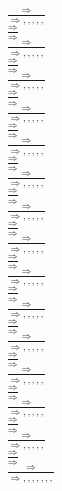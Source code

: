 \documentclass[11pt]{article}
\begin{document}
\begin{center}
\bigskip
\\$\frac{\Rightarrow }{\Rightarrow , , , , , }$
\bigskip
\\$\frac{\Rightarrow }{\Rightarrow }$
\bigskip
\\$\frac{\Rightarrow }{\Rightarrow , , , , , }$
\bigskip
\\$\frac{\Rightarrow }{\Rightarrow }$
\bigskip
\\$\frac{\Rightarrow }{\Rightarrow , , , , , }$
\bigskip
\\$\frac{\Rightarrow }{\Rightarrow }$
\bigskip
\\$\frac{\Rightarrow }{\Rightarrow , , , , , }$
\bigskip
\\$\frac{\Rightarrow }{\Rightarrow }$
\bigskip
\\$\frac{\Rightarrow }{\Rightarrow , , , , , }$
\bigskip
\\$\frac{\Rightarrow }{\Rightarrow }$
\bigskip
\\$\frac{\Rightarrow }{\Rightarrow , , , , , }$
\bigskip
\\$\frac{\Rightarrow }{\Rightarrow }$
\bigskip
\\$\frac{\Rightarrow }{\Rightarrow , , , , , }$
\bigskip
\\$\frac{\Rightarrow }{\Rightarrow }$
\bigskip
\\$\frac{\Rightarrow }{\Rightarrow , , , , , }$
\bigskip
\\$\frac{\Rightarrow }{\Rightarrow }$
\bigskip
\\$\frac{\Rightarrow }{\Rightarrow , , , , , }$
\bigskip
\\$\frac{\Rightarrow }{\Rightarrow }$
\bigskip
\\$\frac{\Rightarrow }{\Rightarrow , , , , , }$
\bigskip
\\$\frac{\Rightarrow }{\Rightarrow }$
\bigskip
\\$\frac{\Rightarrow }{\Rightarrow , , , , , }$
\bigskip
\\$\frac{\Rightarrow }{\Rightarrow }$
\bigskip
\\$\frac{\Rightarrow }{\Rightarrow , , , , , }$
\bigskip
\\$\frac{\Rightarrow }{\Rightarrow }$
\bigskip
\\$\frac{\Rightarrow }{\Rightarrow , , , , , }$
\bigskip
\\$\frac{\Rightarrow }{\Rightarrow }$
\bigskip
\\$\frac{\Rightarrow }{\Rightarrow , , , , , }$
\bigskip
\\$\frac{\Rightarrow }{\Rightarrow }$
\bigskip
\\$\frac{\Rightarrow }{\Rightarrow , , , , , , , }$

\end{center}
\end{document}
